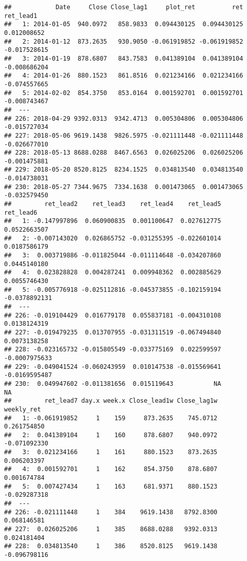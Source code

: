 \documentclass[
]{article}
\begin{document}
\begin{verbatim}
##            Date     Close Close_lag1     plot_ret          ret    ret_lead1
##   1: 2014-01-05  940.0972   858.9833  0.094430125  0.094430125  0.012008652
##   2: 2014-01-12  873.2635   930.9050 -0.061919852 -0.061919852 -0.017528615
##   3: 2014-01-19  878.6807   843.7583  0.041389104  0.041389104 -0.008686204
##   4: 2014-01-26  880.1523   861.8516  0.021234166  0.021234166 -0.074557665
##   5: 2014-02-02  854.3750   853.0164  0.001592701  0.001592701 -0.008743467
##  ---                                                                       
## 226: 2018-04-29 9392.0313  9342.4713  0.005304806  0.005304806 -0.015727034
## 227: 2018-05-06 9619.1438  9826.5975 -0.021111448 -0.021111448 -0.026677010
## 228: 2018-05-13 8688.0288  8467.6563  0.026025206  0.026025206 -0.001475881
## 229: 2018-05-20 8520.8125  8234.1525  0.034813540  0.034813540 -0.014738031
## 230: 2018-05-27 7344.9675  7334.1638  0.001473065  0.001473065 -0.032579450
##         ret_lead2    ret_lead3    ret_lead4    ret_lead5     ret_lead6
##   1: -0.147997896  0.060900835  0.001100647  0.027612775  0.0522663507
##   2: -0.007143020  0.026865752 -0.031255395 -0.022601014  0.0187586179
##   3:  0.003719886 -0.011825044 -0.011114648 -0.034207860  0.0445140180
##   4:  0.023828828  0.004287241  0.009948362  0.002885629  0.0055746430
##   5: -0.005776918 -0.025112816 -0.045373855 -0.102159194 -0.0378892131
##  ---                                                                  
## 226: -0.019104429  0.016779178  0.055837181 -0.004310108  0.0138124319
## 227: -0.019479235  0.013707955 -0.031311519 -0.067494840  0.0073138258
## 228: -0.023165732 -0.015805549 -0.033775169  0.022599597 -0.0007975633
## 229: -0.049041524 -0.060243959  0.010147538 -0.015569641 -0.0169595487
## 230:  0.049947602 -0.011381656  0.015119643           NA            NA
##         ret_lead7 day.x week.x Close_lead1w Close_lag1w   weekly_ret
##   1: -0.061919852     1    159     873.2635    745.0712  0.261754850
##   2:  0.041389104     1    160     878.6807    940.0972 -0.071092330
##   3:  0.021234166     1    161     880.1523    873.2635  0.006203397
##   4:  0.001592701     1    162     854.3750    878.6807  0.001674784
##   5:  0.007427434     1    163     681.9371    880.1523 -0.029287318
##  ---                                                                
## 226: -0.021111448     1    384    9619.1438   8792.8300  0.068146581
## 227:  0.026025206     1    385    8688.0288   9392.0313  0.024181404
## 228:  0.034813540     1    386    8520.8125   9619.1438 -0.096798116

\end{verbatim}
\end{document}
